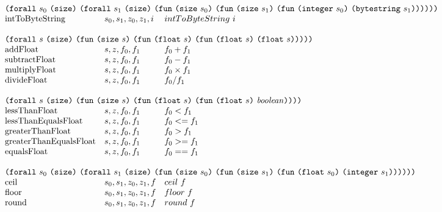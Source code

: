 \documentclass[../main.tex]{subfiles}
\begin{document}
\begin{figure*}[t]
\[\begin{array}{lll}
        \multicolumn{3}{l}{\forallT{s_0}{\sizeK{}}{\forallT{s_1}{\sizeK{}}{\funT{\sizeT{s_0}}{\funT{\sizeT{s_1}}{\funT{\integerT{s_0}}{\bytestringT{s_1}}}}}}}\\
        \mathrm{intToByteString}            &  s_0, s_1, z_0, z_1, i           &   intToByteString ~ i   \\
        &&\\
        
        
        \multicolumn{3}{l}{\forallT{s}{\sizeK{}}{\funT{\sizeT{s}}{\funT{\floatT{s}}{\funT{\floatT{s}}{\floatT{s}}}}}}\\
        \mathrm{addFloat}                 &   s, z, f_0 , f_1   &   f_0 + f_1               \\
        \mathrm{subtractFloat}            &   s, z, f_0 , f_1   &   f_0 - f_1               \\
        \mathrm{multiplyFloat}            &   s, z, f_0 , f_1   &   f_0 \times f_1          \\
        \mathrm{divideFloat}              &   s, z, f_0 , f_1   &   f_0/f_1                 \\
        
        &&\\
        
        \multicolumn{3}{l}{\forallT{s}{\sizeK{}}{\funT{\sizeT{s}}{\funT{\floatT{s}}{\funT{\floatT{s}}{\mathit{boolean}}}}}}\\
        \mathrm{lessThanFloat}            &   s, z, f_0 , f_1   &   f_0 < f_1               \\
        \mathrm{lessThanEqualsFloat}      &   s, z, f_0 , f_1   &   f_0 <= f_1              \\
        \mathrm{greaterThanFloat}         &   s, z, f_0 , f_1   &   f_0 > f_1               \\
        \mathrm{greaterThanEqualsFloat}   &   s, z, f_0 , f_1   &   f_0 >= f_1              \\
        \mathrm{equalsFloat}              &   s, z, f_0 , f_1   &   f_0 == f_1              \\
        &&\\
        
        \multicolumn{3}{l}{\forallT{s_0}{\sizeK{}}{\forallT{s_1}{\sizeK{}}{\funT{\sizeT{s_0}}{\funT{\sizeT{s_1}}{\funT{\floatT{s_0}}{\integerT{s_1}}}}}}}\\
        \mathrm{ceil}                     &   s_0, s_1, z_0, z_1, f           &   ceil ~ f                \\
        \mathrm{floor}                    &   s_0, s_1, z_0, z_1, f           &   floor ~ f               \\
        \mathrm{round}                    &   s_0, s_1, z_0, z_1, f           &   round ~ f               \\
        &&\\
        

\end{array}\]
\end{figure*}
\end{document}
